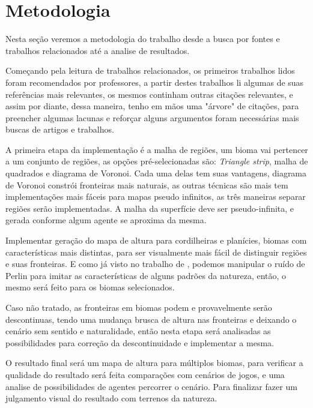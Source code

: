 \chapter{Metodologia}
Nesta seção veremos a metodologia do trabalho desde a busca por fontes e trabalhos
relacionados até a analise de resultados.

Começando pela leitura de trabalhos relacionados, os primeiros trabalhos lidos
foram recomendados por professores, a partir destes trabalhos li algumas de suas
referências mais relevantes, os mesmos continham outras citações relevantes, e
assim por diante, dessa maneira, tenho em mãos uma "árvore" de citações,
para preencher algumas lacunas e reforçar alguns argumentos foram necessárias
mais buscas de artigos e trabalhos.

A primeira etapa da implementação é a malha de regiões, um
bioma vai pertencer a um conjunto de regiões, as opções
pré-selecionadas são: \textit{Triangle strip}, malha de quadrados e diagrama de
Voronoi. Cada uma delas tem suas vantagens, diagrama de Voronoi constrói fronteiras
mais naturais, as outras técnicas são mais tem implementações mais fáceis 
para mapas pseudo infinitos, as três maneiras separar regiões serão implementadas.
A malha da superfície deve ser pseudo-infinita, e gerada conforme algum agente 
se aproxima da mesma.

Implementar geração do mapa de altura para cordilheiras e planícies, biomas com características mais distintas, para ser visualmente
mais fácil de distinguir regiões e suas fronteiras. %
E como já visto no trabalho de \cite{carli2012canion}, podemos manipular o ruído
de Perlin para imitar as características de alguns padrões da natureza, então, 
o mesmo será feito para os biomas selecionados.

Caso não tratado, as fronteiras em biomas podem e provavelmente serão
descontinuas, tendo uma mudança brusca de altura nas fronteiras e deixando o
cenário sem sentido e naturalidade, então nesta etapa será analisadas as
possibilidades para correção da descontinuidade e implementar a mesma.

O resultado final será um mapa de altura para múltiplos biomas, para verificar
a qualidade do resultado será feita comparações com cenários de jogos, e uma
analise de possibilidades de agentes percorrer o cenário. Para finalizar fazer
um julgamento visual do resultado com terrenos da natureza.